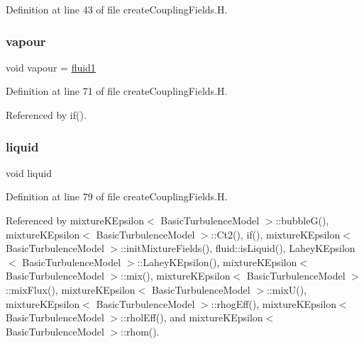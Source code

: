 Definition at line 43 of file create\+Coupling\+Fields.\+H.

\mbox{\label{createCouplingFields_8H_a591ff58ed296dda46a8a5b8321dce5fb}} 
\subsubsection{\texorpdfstring{vapour}{vapour}}
{\footnotesize\ttfamily void vapour = \hyperlink{createCouplingFields_8H_a25f7a0918d80e813426eef4229632ba7}{fluid1}}



Definition at line 71 of file create\+Coupling\+Fields.\+H.



Referenced by if().

\mbox{\label{createCouplingFields_8H_a113830654a80b7f398863f96bf351e05}} 
\subsubsection{\texorpdfstring{liquid}{liquid}}
{\footnotesize\ttfamily void liquid}



Definition at line 79 of file create\+Coupling\+Fields.\+H.



Referenced by mixture\+K\+Epsilon$<$ Basic\+Turbulence\+Model $>$\+::bubble\+G(), mixture\+K\+Epsilon$<$ Basic\+Turbulence\+Model $>$\+::\+Ct2(), if(), mixture\+K\+Epsilon$<$ Basic\+Turbulence\+Model $>$\+::init\+Mixture\+Fields(), fluid\+::is\+Liquid(), Lahey\+K\+Epsilon$<$ Basic\+Turbulence\+Model $>$\+::\+Lahey\+K\+Epsilon(), mixture\+K\+Epsilon$<$ Basic\+Turbulence\+Model $>$\+::mix(), mixture\+K\+Epsilon$<$ Basic\+Turbulence\+Model $>$\+::mix\+Flux(), mixture\+K\+Epsilon$<$ Basic\+Turbulence\+Model $>$\+::mix\+U(), mixture\+K\+Epsilon$<$ Basic\+Turbulence\+Model $>$\+::rhog\+Eff(), mixture\+K\+Epsilon$<$ Basic\+Turbulence\+Model $>$\+::rhol\+Eff(), and mixture\+K\+Epsilon$<$ Basic\+Turbulence\+Model $>$\+::rhom().

\mbox{\label{createCouplingFields_8H_af4e3c1de091ffc91c131e672df22b96b}} 
